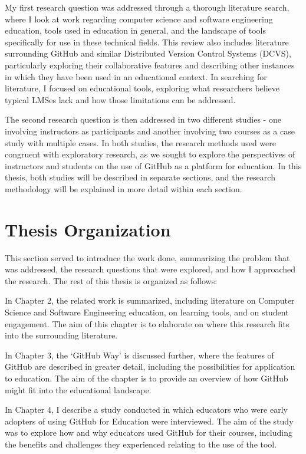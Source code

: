 
My first research question was addressed through a thorough literature search, where I look at work regarding computer science and software engineering education, tools used in education in general, and the landscape of tools specifically for use in these technical fields. This review also includes literature surrounding GitHub and similar Distributed Version Control Systems (DCVS), particularly exploring their collaborative features and describing other instances in which they have been used in an educational context. In searching for literature, I focused on educational tools, exploring what researchers believe typical LMSes lack and how those limitations can be addressed.

The second research question is then addressed in two different studies - one involving instructors as participants and another involving two courses as a case study with multiple cases. In both studies, the research methods used were congruent with exploratory research, as we sought to explore the perspectives of instructors and students on the use of GitHub as a platform for education. In this thesis, both studies will be described in separate sections, and the research methodology will be explained in more detail within each section.

\section{Thesis Organization}
This section served to introduce the work done, summarizing the problem that was addressed, the research questions that were explored, and how I approached the research. The rest of this thesis is organized as follows:

In Chapter 2, the related work is summarized, including literature on Computer Science and Software Engineering education, on learning tools, and on student engagement. The aim of this chapter is to elaborate on where this research fits into the surrounding literature.

In Chapter 3, the `GitHub Way' is discussed further, where the features of GitHub are described in greater detail, including the possibilities for application to education. The aim of the chapter is to provide an overview of how GitHub might fit into the educational landscape.

In Chapter 4, I describe a study conducted in which educators who were early adopters of using GitHub for Education were interviewed. The aim of the study was to explore how and why educators used GitHub for their courses, including the benefits and challenges they experienced relating to the use of the tool.

